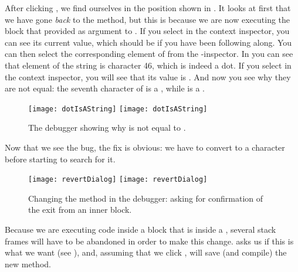 \documentclass[a4paper,10pt,twoside]{book}
\begin{document}
After clicking , we find ourselves in the position shown in .
It looks at first that we have gone \emph{back} to the  method, but this is because we are now executing the block that  provided as argument to .
If you select  in the context inspector, you can see its current value, which should be  if you have been following along.
You can then select the corresponding element of \self from the \self{}-inspector.
In  you can see that element  of the string is character 46, which is indeed a dot.
If you select  in the context inspector, you will see that its value is .
And now you see why they are not equal: the seventh character of  is a , while  is a .

\begin{figure}[btp]
	\begin{center}
	\ifluluelse
		{\texttt{[image: dotIsAString]}}
		{\texttt{[image: dotIsAString]}}
	\end{center}
	\caption{The debugger showing why  is not equal to .}
	\label{fig:dotIsAString}
\end{figure}

Now that we see the bug, the fix is obvious: we have to convert  to a character before starting to search for it.

\begin{figure}[btp]
	\begin{center}
	\ifluluelse
		{\texttt{[image: revertDialog]}}
		{\texttt{[image: revertDialog]}}
	\end{center}
	\caption{Changing the  method in the debugger: asking for confirmation of the exit from an inner block.}
	\label{fig:revertDialog}
\end{figure}

Because we are executing code inside a block that is inside a , several stack frames will have to be abandoned in order to make this change.
\sq asks us if this is what we want (see ), and, assuming that we click , will save (and compile) the new method.

\end{document}
